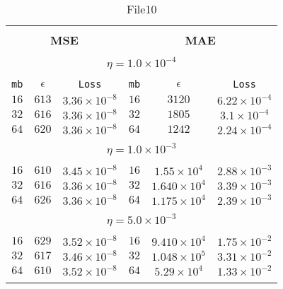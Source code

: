 \begin{table}[]
  \small
  
\begin{center}
\caption{File10}\label{tab:mae3}
\begin{tabular}{@{}ccc|ccc@{}}

\hline\\[-11pt]
\hline\\[-6.5pt]
\multicolumn{3}{c}{\bf MSE} & \multicolumn{3}{c}{\bf MAE } \\[5pt]
\hline\\[-11pt]
\multicolumn{6}{c}{$\eta = 1.0\times 10^{-4}$} \\[5pt]
\hline\\[-11pt]
\texttt{mb} & \texttt{$\epsilon$} & \texttt{Loss} & \texttt{mb} & \texttt{$\epsilon$} & \texttt{Loss} \\[1pt]
$16$ & $613$ & $3.36\times 10^{-8}$  &  $16$ & $3120$ & $6.22\times 10^{-4}$    \\ [1pt]
$32$ & $616$ & $3.36\times 10^{-8}$  &  $32$ & $1805$ & $3.1\times 10^{-4}$     \\ [1pt]
$64$ & $620$ & $3.36\times 10^{-8}$  &  $64$ & $1242$ & $2.24\times 10^{-4}$    \\ [1pt]

\hline\\[-11pt]
\multicolumn{6}{c}{$\eta = 1.0\times 10^{-3}$} \\[5pt]
\hline\\[-11pt]
$16$ & $610$ & $3.45\times 10^{-8}$  &  $16$ & $1.55\times 10^{4}$ & $2.88\times 10^{-3}$   \\ [1pt]
$32$ & $616$ & $3.36\times 10^{-8}$  &  $32$ & $1.640\times 10^{4}$ & $3.39\times 10^{-3}$   \\ [1pt]
$64$ & $626$ & $3.36\times 10^{-8}$  &  $64$ & $1.175\times 10^{4}$ & $2.39\times 10^{-3}$   \\ [1pt]
\hline\\[-11pt]
\multicolumn{6}{c}{$\eta = 5.0\times 10^{-3}$} \\[5pt]
\hline\\[-11pt]
$16$ & $629$ & $3.52\times 10^{-8}$  &  $16$ & $9.410\times 10^{4}$ & $1.75\times 10^{-2}$   \\ [1pt]
$32$ & $617$ & $3.46\times 10^{-8}$  &  $32$ & $1.048\times 10^{5}$ & $3.31\times 10^{-2}$  \\ [1pt]
$64$ & $610$ & $3.52\times 10^{-8}$  &  $64$ & $5.29\times 10^{4}$ & $1.33\times 10^{-2}$   \\ [1pt]
\hline\\[-11pt]


\end{tabular}
\end{center}
\end{table}
